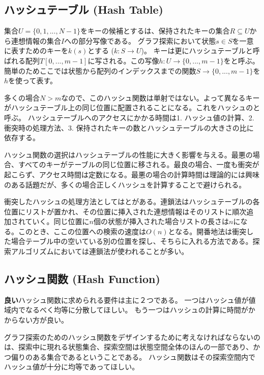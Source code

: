 \subsection{ハッシュテーブル (Hash Table)}
\label{sec:hash-table}

集合$U = \{0, 1, ..., N - 1\}$をキーの候補とするは、保持されたキーの集合$R \subseteq U$から連想情報の集合$I$への部分写像である。
グラフ探索において状態$s \in S$を一意に表すためのキーを$k(s)$とする ($k: S \rightarrow U$)。
キーは更にハッシュテーブルと呼ばれる配列$T[0, ..., m-1]$に写される。この写像$h: U \rightarrow \{0, ..., m-1\}$をと呼ぶ。簡単のためここでは状態から配列のインデックスまでの関数$S \rightarrow \{0, ..., m-1\}$を$h$を使って表す。

多くの場合$N > m$なので、このハッシュ関数は単射ではない。よって異なるキーがハッシュテーブル上の同じ位置に配置されることになる。これをハッシュのと呼ぶ。
ハッシュテーブルへのアクセスにかかる時間は1. ハッシュ値の計算、2. 衝突時の処理方法、3. 保持されたキーの数とハッシュテーブルの大きさの比に依存する。

ハッシュ関数の選択はハッシュテーブルの性能に大きく影響を与える。最悪の場合、すべてのキーがテーブルの同じ位置に移される。最良の場合、一度も衝突が起こらず、アクセス時間は定数になる。最悪の場合の計算時間は理論的には興味のある話題だが、多くの場合正しくハッシュを計算することで避けられる。

衝突したハッシュの処理方法としてはとがある。連鎖法はハッシュテーブルの各位置にリストが置かれ、その位置に挿入された連想情報はそのリストに順次追加されていく。同じ位置に$n$個の状態が挿入された場合リストの長さは$n$になる。このとき、ここの位置への検索の速度は$O(n)$となる。開番地法は衝突した場合テーブル中の空いている別の位置を探し、そちらに入れる方法である。探索アルゴリズムにおいては連鎖法が使われることが多い。


\subsection{ハッシュ関数 (Hash Function)}
\label{sec:hash-function}

{\bf 良い}ハッシュ関数に求められる要件は主に２つである。
一つはハッシュ値が値域内でなるべく均等に分散してほしい。
もう一つはハッシュの計算に時間がかからない方が良い。

グラフ探索のためのハッシュ関数をデザインするために考えなければならないのは、探索中に現れる状態集合、探索空間は状態空間全体のほんの一部であり、かつ偏りのある集合であるということである。
ハッシュ関数はその探索空間内でハッシュ値が十分に均等であってほしい。


